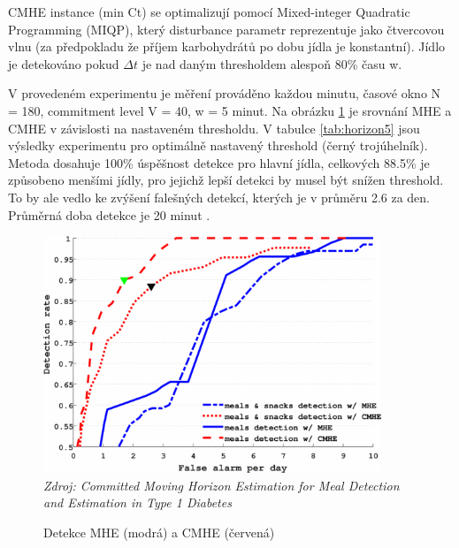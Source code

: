 CMHE instance (min Ct) se optimalizují pomocí Mixed-integer Quadratic Programming (MIQP), který disturbance parametr reprezentuje jako čtvercovou vlnu (za předpokladu že příjem karbohydrátů po dobu jídla je konstantní). Jídlo je detekováno pokud $\Delta t$ je nad daným thresholdem alespoň 80\% času w.

V provedeném experimentu je měření prováděno každou minutu, časové okno N = 180, commitment level V = 40, w = 5 minut. Na obrázku \ref{fig:horizon4} je srovnání MHE a CMHE v závislosti na nastaveném thresholdu.  V tabulce \ref{tab:horizon5} jsou výsledky experimentu pro optimálně nastavený threshold (černý trojúhelník). Metoda dosahuje 100\% úspěšnost detekce pro hlavní jídla, celkových 88.5\% je způsobeno menšími jídly, pro jejichž lepší detekci by musel být snížen threshold. To by ale vedlo ke zvýšení falešných detekcí, kterých je v průměru 2.6 za den. Průměrná doba detekce je 20 minut \citep{Analyza.MovingHorizon}.

\begin{figure}[H]
\caption{Detekce MHE (modrá) a CMHE (červená)}
\label{fig:horizon4}
\centering
\includegraphics[width=0.9\textwidth]{img/analyza/horizon4.png}\\
\textit{Zdroj: Committed Moving Horizon Estimation for Meal Detection and Estimation in Type 1 Diabetes \citep{Analyza.MovingHorizon}}
\end{figure}

